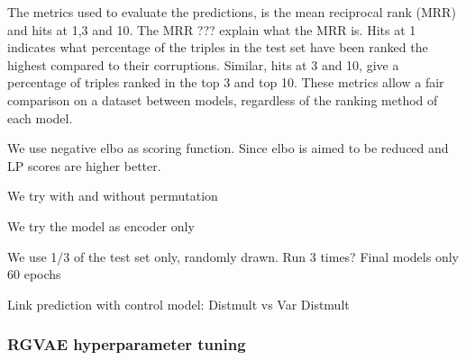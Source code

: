 The metrics used to evaluate the predictions, is the mean reciprocal rank (MRR) and hits at 1,3 and 10.
The MRR ??? explain what the MRR is. \linebreak
Hits at 1 indicates what percentage of the triples in the test set have been ranked the highest compared to their corruptions. Similar, hits at 3 and 10, give a percentage of triples ranked in the top 3 and top 10.
These metrics allow a fair comparison on a dataset between models, regardless of the ranking method of each model.





We use negative elbo as scoring function. Since elbo is aimed to be reduced and LP scores are higher better.

We try with and without permutation

We try the model as encoder only

We use 1/3 of the test set only, randomly drawn. Run 3 times?
Final models only 60 epochs

Link prediction with control model:
Distmult vs Var Distmult

\subsubsection{RGVAE hyperparameter tuning}

